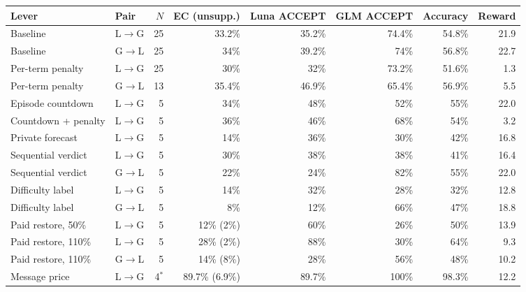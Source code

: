 \begin{tabular}{@{}llrrrrrr@{}}
\toprule
Lever & Pair & $N$ & EC (unsupp.) & Luna ACCEPT & GLM ACCEPT & Accuracy & Reward \\
\midrule
Baseline & L$\to$G & 25 & 33.2\% & 35.2\% & 74.4\% & 54.8\% & 21.9 \\
Baseline & G$\to$L & 25 & 34\% & 39.2\% & 74\% & 56.8\% & 22.7 \\
\addlinespace[2pt]
Per-term penalty & L$\to$G & 25 & 30\% & 32\% & 73.2\% & 51.6\% & 1.3 \\
Per-term penalty & G$\to$L & 13 & 35.4\% & 46.9\% & 65.4\% & 56.9\% & 5.5 \\
\addlinespace[2pt]
Episode countdown & L$\to$G & 5 & 34\% & 48\% & 52\% & 55\% & 22.0 \\
Countdown + penalty & L$\to$G & 5 & 36\% & 46\% & 68\% & 54\% & 3.2 \\
Private forecast & L$\to$G & 5 & 14\% & 36\% & 30\% & 42\% & 16.8 \\
Sequential verdict & L$\to$G & 5 & 30\% & 38\% & 38\% & 41\% & 16.4 \\
Sequential verdict & G$\to$L & 5 & 22\% & 24\% & 82\% & 55\% & 22.0 \\
Difficulty label & L$\to$G & 5 & 14\% & 32\% & 28\% & 32\% & 12.8 \\
Difficulty label & G$\to$L & 5 & 8\% & 12\% & 66\% & 47\% & 18.8 \\
\addlinespace[2pt]
Paid restore, 50\% & L$\to$G & 5 & 12\% (2\%) & 60\% & 26\% & 50\% & 13.9 \\
Paid restore, 110\% & L$\to$G & 5 & 28\% (2\%) & 88\% & 30\% & 64\% & 9.3 \\
Paid restore, 110\% & G$\to$L & 5 & 14\% (8\%) & 28\% & 56\% & 48\% & 10.2 \\
Message price & L$\to$G & 4$^{*}$ & 89.7\% (6.9\%) & 89.7\% & 100\% & 98.3\% & 12.2 \\
\bottomrule
\end{tabular}
